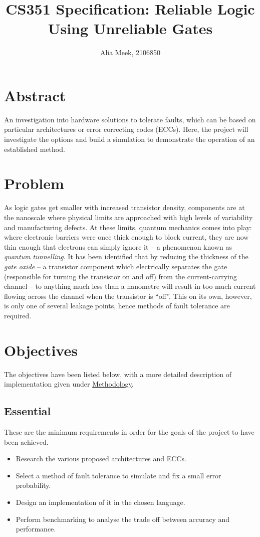 \documentclass[12pt,a4paper]{article}
\title{CS351 Specification: Reliable Logic Using Unreliable Gates}
\author{Alia Meek, 2106850}
\date{}
\begin{document}
\maketitle


\section{Abstract}
An investigation into hardware solutions to tolerate faults, which can be based on particular architectures or error 
correcting codes (ECCs). Here, the project will investigate the options and build a simulation to demonstrate the 
operation of an established method.


\section{Problem}
As logic gates get smaller with increased transistor density, components are at the nanoscale where physical limits 
are approached with high levels of variability and manufacturing defects. At these limits, quantum mechanics comes 
into play: where electronic barriers were once thick enough to block current, they are now thin enough that electrons 
can simply ignore it -- a phenomenon known as \emph{quantum tunnelling}. It has been identified that by reducing the 
thickness of the \emph{gate oxide} -- a transistor component which electrically separates the gate (responsible for 
turning the transistor on and off) from the current-carrying channel -- to anything much less than a nanometre will 
result in too much current flowing across the channel when the transistor is “off”. This on its own, however, is 
only one of several leakage points, hence methods of fault tolerance are required.\cite{ref1}


\section{Objectives}
The objectives have been listed below, with a more detailed description of implementation given under 
\hyperref[sec:meth]{Methodology}.

\subsection{Essential}
These are the minimum requirements in order for the goals of the project to have been achieved.
\begin{itemize}
    \item Research the various proposed architectures and ECCs.
    \item Select a method of fault tolerance to simulate and fix a small error probability.
    \item Design an implementation of it in the chosen language.
    \item Perform benchmarking to analyse the trade off between accuracy and performance.
\end{itemize}
\end{document}
